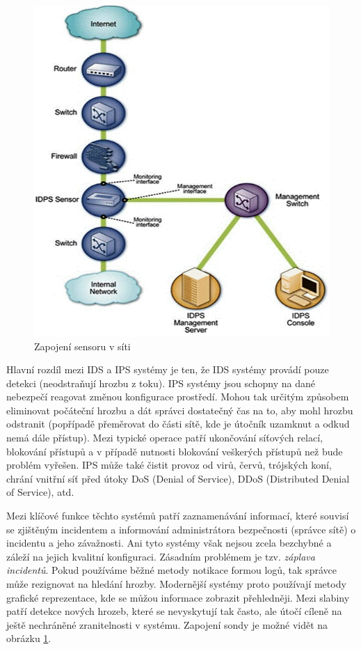 \documentclass[11pt,a4paper]{article}
\begin{document}
\begin{figure}
	\includegraphics[scale=0.4]{./pict/idps.png}
	\caption{Zapojení sensoru v síti \cite{ref:idps}}
	\label{pic:idps_sen}
\end{figure}

Hlavní rozdíl mezi IDS a IPS systémy je ten, že IDS systémy provádí pouze detekci (neodstraňují hrozbu z toku). IPS systémy jsou schopny na dané nebezpečí reagovat změnou konfigurace prostředí. Mohou tak určitým způsobem eliminovat počáteční hrozbu a dát správci dostatečný čas na to, aby mohl hrozbu odstranit (popřípadě přeměrovat do části sítě, kde je útočník uzamknut a odkud nemá dále přístup). Mezi typické operace patří ukončování síťových relací, blokování přístupů a v případě nutnosti blokování veškerých přístupů než bude problém vyřešen. IPS může také čistit provoz od virů, červů, trójských koní, chrání vnitřní síť před útoky DoS (Denial of Service), DDoS (Distributed Denial of Service), atd.

Mezi klíčové funkce těchto systémů patří zaznamenávání informací, které souvisí se zjištěným incidentem a informování administrátora bezpečnosti (správce sítě) o incidentu a jeho závažnosti. Ani tyto systémy však nejsou zcela bezchybné a záleží na jejich kvalitní konfiguraci. Zásadním problémem je tzv. \textit{záplava incidentů}. Pokud používáme běžné metody notikace formou logů, tak správce může rezignovat na hledání hrozby. Modernější systémy proto používají metody grafické reprezentace, kde se můžou informace zobrazit přehledněji. Mezi slabiny patří detekce nových hrozeb, které se nevyskytují tak často, ale útočí cíleně na ještě nechráněné zranitelnosti v systému. Zapojení sondy je možné vidět na obrázku \ref{pic:idps_sen}.
\end{document}
